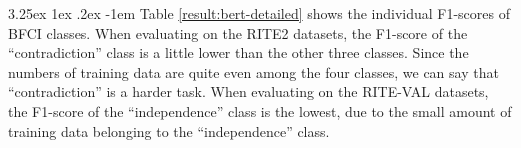 \documentclass[12pt]{article}
\makeatletter
\renewcommand\paragraph{\@startsection{paragraph}{5}{\z@}%
  {3.25ex \@plus1ex \@minus.2ex}%
  {-1em}%
  {\normalfont\normalsize\bfseries}}
\makeatother
\begin{document}
\begin{CJK*}{UTF8}{bkai}
\begin{spacing}{1.77}

\paragraph{}
Table \ref{result:bert-detailed} shows the individual F1-scores of BFCI classes. When evaluating on the RITE2 datasets, the F1-score of the ``contradiction'' class is a little lower than the other three classes. Since the numbers of training data are quite even among the four classes, we can say that ``contradiction'' is a harder task. When evaluating on the RITE-VAL datasets, the F1-score of the ``independence'' class is the lowest, due to the small amount of training data belonging to the ``independence'' class.


\end{spacing}
\end{CJK*}
\end{document}
